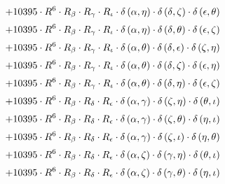 \begin{subequations}
\begin{gather}
 \\[0.2em] \notag 		 + 10395 \cdot R^{6} \cdot R_{\beta{}} \cdot R_{\gamma{}} \cdot R_{\iota{}} \cdot \delta{}\left(\alpha{}, \eta{}\right) \cdot \delta{}\left(\delta{}, \zeta{}\right) \cdot \delta{}\left(\epsilon{}, \theta{}\right) 
 \\[0.2em] \notag 		 + 10395 \cdot R^{6} \cdot R_{\beta{}} \cdot R_{\gamma{}} \cdot R_{\iota{}} \cdot \delta{}\left(\alpha{}, \eta{}\right) \cdot \delta{}\left(\delta{}, \theta{}\right) \cdot \delta{}\left(\epsilon{}, \zeta{}\right) 
 \\[0.2em] \notag 		 + 10395 \cdot R^{6} \cdot R_{\beta{}} \cdot R_{\gamma{}} \cdot R_{\iota{}} \cdot \delta{}\left(\alpha{}, \theta{}\right) \cdot \delta{}\left(\delta{}, \epsilon{}\right) \cdot \delta{}\left(\zeta{}, \eta{}\right) 
 \\[0.2em] \notag 		 + 10395 \cdot R^{6} \cdot R_{\beta{}} \cdot R_{\gamma{}} \cdot R_{\iota{}} \cdot \delta{}\left(\alpha{}, \theta{}\right) \cdot \delta{}\left(\delta{}, \zeta{}\right) \cdot \delta{}\left(\epsilon{}, \eta{}\right) 
 \\[0.2em] \notag 		 + 10395 \cdot R^{6} \cdot R_{\beta{}} \cdot R_{\gamma{}} \cdot R_{\iota{}} \cdot \delta{}\left(\alpha{}, \theta{}\right) \cdot \delta{}\left(\delta{}, \eta{}\right) \cdot \delta{}\left(\epsilon{}, \zeta{}\right) 
 \\[0.2em] \notag 		 + 10395 \cdot R^{6} \cdot R_{\beta{}} \cdot R_{\delta{}} \cdot R_{\epsilon{}} \cdot \delta{}\left(\alpha{}, \gamma{}\right) \cdot \delta{}\left(\zeta{}, \eta{}\right) \cdot \delta{}\left(\theta{}, \iota{}\right) 
 \\[0.2em] \notag 		 + 10395 \cdot R^{6} \cdot R_{\beta{}} \cdot R_{\delta{}} \cdot R_{\epsilon{}} \cdot \delta{}\left(\alpha{}, \gamma{}\right) \cdot \delta{}\left(\zeta{}, \theta{}\right) \cdot \delta{}\left(\eta{}, \iota{}\right) 
 \\[0.2em] \notag 		 + 10395 \cdot R^{6} \cdot R_{\beta{}} \cdot R_{\delta{}} \cdot R_{\epsilon{}} \cdot \delta{}\left(\alpha{}, \gamma{}\right) \cdot \delta{}\left(\zeta{}, \iota{}\right) \cdot \delta{}\left(\eta{}, \theta{}\right) 
 \\[0.2em] \notag 		 + 10395 \cdot R^{6} \cdot R_{\beta{}} \cdot R_{\delta{}} \cdot R_{\epsilon{}} \cdot \delta{}\left(\alpha{}, \zeta{}\right) \cdot \delta{}\left(\gamma{}, \eta{}\right) \cdot \delta{}\left(\theta{}, \iota{}\right) 
 \\[0.2em] \notag 		 + 10395 \cdot R^{6} \cdot R_{\beta{}} \cdot R_{\delta{}} \cdot R_{\epsilon{}} \cdot \delta{}\left(\alpha{}, \zeta{}\right) \cdot \delta{}\left(\gamma{}, \theta{}\right) \cdot \delta{}\left(\eta{}, \iota{}\right) 

\end{gather}
\end{subequations}
